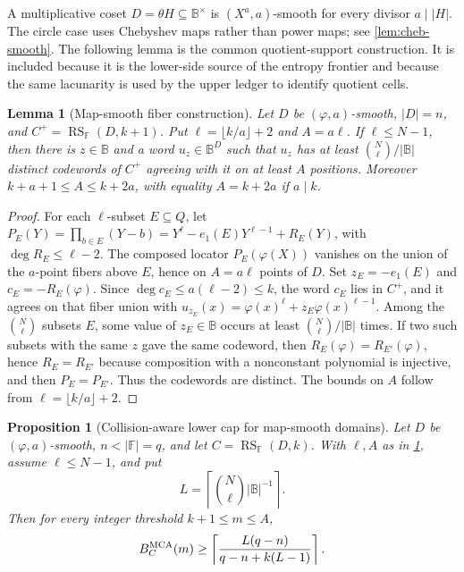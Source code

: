 \documentclass[12pt,a4paper]{amsart}
\numberwithin{equation}{section}
\newtheorem{proposition}[proposition]{Proposition}
\newtheorem{lemma}[lemma]{Lemma}
\theoremstyle{remark}
\DeclareMathOperator{\RS}{RS}
\newcommand{\F}{\mathbb F}
\newcommand{\B}{\mathbb B}
\newcommand{\abs}[1]{\lvert #1\rvert}
\begin{document}
A multiplicative coset \(D=\theta H\subseteq\B^\times\) is \((X^a,a)\)-smooth for every divisor \(a\mid\abs H\).  The circle case uses Chebyshev maps rather than power maps; see \cref{lem:cheb-smooth}.  The following lemma is the common quotient-support construction.  It is included because it is the lower-side source of the entropy frontier and because the same lacunarity is used by the upper ledger to identify quotient cells.

\begin{lemma}[Map-smooth fiber construction]\label{lem:map-smooth-fiber}
Let \(D\) be \((\varphi,a)\)-smooth, \(\abs D=n\), and \(C^+=\RS_\F(D,k+1)\).  Put \(\ell=\lfloor k/a\rfloor+2\) and \(A=a\ell\).  If \(\ell\le N-1\), then there is \(z\in\B\) and a word \(u_z\in\B^D\) such that \(u_z\) has at least \(\binom N\ell/\abs\B\) distinct codewords of \(C^+\) agreeing with it on at least \(A\) positions.  Moreover \(k+a+1\le A\le k+2a\), with equality \(A=k+2a\) if \(a\mid k\).
\end{lemma}

\begin{proof}
For each \(\ell\)-subset \(E\subseteq Q\), let \(P_E(Y)=\prod_{b\in E}(Y-b)=Y^\ell-e_1(E)Y^{\ell-1}+R_E(Y)\), with \(\deg R_E\le\ell-2\).  The composed locator \(P_E(\varphi(X))\) vanishes on the union of the \(a\)-point fibers above \(E\), hence on \(A=a\ell\) points of \(D\).  Set \(z_E=-e_1(E)\) and \(c_E=-R_E(\varphi)\).  Since \(\deg c_E\le a(\ell-2)\le k\), the word \(c_E\) lies in \(C^+\), and it agrees on that fiber union with \(u_{z_E}(x)=\varphi(x)^\ell+z_E\varphi(x)^{\ell-1}\).  Among the \(\binom N\ell\) subsets \(E\), some value of \(z_E\in\B\) occurs at least \(\binom N\ell/\abs\B\) times.  If two such subsets with the same \(z\) gave the same codeword, then \(R_E(\varphi)=R_{E'}(\varphi)\), hence \(R_E=R_{E'}\) because composition with a nonconstant polynomial is injective, and then \(P_E=P_{E'}\).  Thus the codewords are distinct.  The bounds on \(A\) follow from \(\ell=\lfloor k/a\rfloor+2\).
\end{proof}

\begin{proposition}[Collision-aware lower cap for map-smooth domains]\label{prop:map-smooth-cap}
Let \(D\) be \((\varphi,a)\)-smooth, \(n<\abs\F=q\), and let
\(C=\RS_\F(D,k)\).  With \(\ell,A\) as in
\cref{lem:map-smooth-fiber}, assume \(\ell\le N-1\), and put
\[
 L=\left\lceil\binom N\ell\abs\B^{-1}\right\rceil.
\]
Then for every integer threshold \(k+1\le m\le A\),
\[
 B_C^{\rm MCA}(m)\ge
 \left\lceil\frac{L(q-n)}{q-n+k(L-1)}\right\rceil .
\]
\end{proposition}
\end{document}
